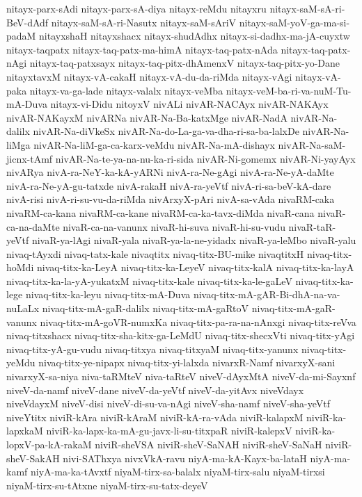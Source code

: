 {nitayx-parx-sAdi
nitayx-parx-sA-diya
nitayx-reMdu
nitayxru
nitayx-saM-sA-ri-BeV-dAdf
nitayx-saM-sA-ri-Nasutx
nitayx-saM-sAriV
nitayx-saM-yoV-ga-ma-si-padaM
nitayxshaH
nitayxshacx
nitayx-shudAdhx
nitayx-si-dadhx-ma-jA-cuyxtw
nitayx-taqpatx
nitayx-taq-patx-ma-himA
nitayx-taq-patx-nAda
nitayx-taq-patx-nAgi
nitayx-taq-patxsayx
nitayx-taq-pitx-dhAmenxV
nitayx-taq-pitx-yo-Dane
nitayxtavxM
nitayx-vA-cakaH
nitayx-vA-du-da-riMda
nitayx-vAgi
nitayx-vA-paka
nitayx-va-ga-lade
nitayx-valalx
nitayx-veMba
nitayx-veM-ba-ri-va-nuM-Tu-mA-Duva
nitayx-vi-Didu
nitoyxV
nivALi
nivAR-NACAyx
nivAR-NAKAyx
nivAR-NAKayxM
nivARNa
nivAR-Na-Ba-katxMge
nivAR-NadA
nivAR-Na-dalilx
nivAR-Na-diVkeSx
nivAR-Na-do-La-ga-va-dha-ri-sa-ba-lalxDe
nivAR-Na-liMga
nivAR-Na-liM-ga-ca-karx-veMdu
nivAR-Na-mA-dishayx
nivAR-Na-saM-jicnx-tAmf
nivAR-Na-te-ya-na-nu-ka-ri-sida
nivAR-Ni-gomemx
nivAR-Ni-yayAyx
nivARya
nivA-ra-NeY-ka-kA-yARNi
nivA-ra-Ne-gAgi
nivA-ra-Ne-yA-daMte
nivA-ra-Ne-yA-gu-tatxde
nivA-rakaH
nivA-ra-yeVtf
nivA-ri-sa-beV-kA-dare
nivA-risi
nivA-ri-su-vu-da-riMda
nivArxyX-pAri
nivA-sa-vAda
nivaRM-caka
nivaRM-ca-kana
nivaRM-ca-kane
nivaRM-ca-ka-tavx-diMda
nivaR-cana
nivaR-ca-na-daMte
nivaR-ca-na-vanunx
nivaR-hi-suva
nivaR-hi-su-vudu
nivaR-taR-yeVtf
nivaR-ya-lAgi
nivaR-yala
nivaR-ya-la-ne-yidadx
nivaR-ya-leMbo
nivaR-yalu
nivaq-tAyxdi
nivaq-tatx-kale
nivaqtitx
nivaq-titx-BU-mike
nivaqtitxH
nivaq-titx-hoMdi
nivaq-titx-ka-LeyA
nivaq-titx-ka-LeyeV
nivaq-titx-kalA
nivaq-titx-ka-layA
nivaq-titx-ka-la-yA-yukatxM
nivaq-titx-kale
nivaq-titx-ka-le-gaLeV
nivaq-titx-ka-lege
nivaq-titx-ka-leyu
nivaq-titx-mA-Duva
nivaq-titx-mA-gAR-Bi-dhA-na-va-nuLaLx
nivaq-titx-mA-gaR-dalilx
nivaq-titx-mA-gaRtoV
nivaq-titx-mA-gaR-vanunx
nivaq-titx-mA-goVR-numxKa
nivaq-titx-pa-ra-na-nAnxgi
nivaq-titx-reVva
nivaq-titxshacx
nivaq-titx-sha-kitx-ga-LeMdU
nivaq-titx-shecxVti
nivaq-titx-yAgi
nivaq-titx-yA-gu-vudu
nivaq-titxya
nivaq-titxyaM
nivaq-titx-yanunx
nivaq-titx-yeMdu
nivaq-titx-ye-nipapx
nivaq-titx-yi-lalxda
nivarxR-Namf
nivarxyX-sani
nivarxyX-sa-niya
niva-taRMteV
niva-taRteV
niveV-dAyxMtA
niveV-da-mi-Sayxnf
niveV-da-namf
niveV-dane
niveV-da-yeVtf
niveV-da-yitAvx
niveVdayx
niveVdayxM
niveV-disi
niveV-di-su-va-nAgi
niveV-sha-namf
niveV-sha-yeVtf
niveYtitx
niviR-kAra
niviR-kAraM
niviR-kA-ra-vAda
niviR-kalapxM
niviR-ka-lapxkaM
niviR-ka-lapx-ka-mA-gu-javx-li-su-titxpaR
niviR-kalepxV
niviR-ka-lopxV-pa-kA-rakaM
niviR-sheVSA
niviR-sheV-SaNAH
niviR-sheV-SaNaH
niviR-sheV-SakAH
nivi-SAThxya
nivxVkA-ravu
niyA-ma-kA-Kayx-ba-lataH
niyA-ma-kamf
niyA-ma-ka-tAvxtf
niyaM-tirx-sa-balalx
niyaM-tirx-salu
niyaM-tirxsi
niyaM-tirx-su-tAtxne
niyaM-tirx-su-tatx-deyeV
}
